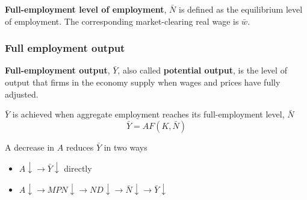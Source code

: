 \begin{definition}
    \textbf{Full-employment level of employment}, $ \bar{N} $ is defined as the equilibrium level of employment. The corresponding market-clearing real wage is $ \bar{w} $.
\end{definition}
\begin{center}
\end{center}
\subsubsection{Full employment output}
\begin{definition}
    \textbf{Full-employment output}, $\bar{Y}$, also called \textbf{potential output}, is the level of output that firms in the economy supply when wages and prices have fully adjusted. 

    $\bar{Y} $ is achieved when aggregate employment reaches its full-employment level, $\bar{N}$
    \[
        \bar{Y}  = AF \left( K, \bar{N}  \right) 
    \]
\end{definition}
\begin{remark}
    A decrease in $A$ reduces $\bar{Y} $ in two ways
    \begin{itemize}
        \item  $A \downarrow \rightarrow \bar{Y} \downarrow$ directly 
        \item  $A \downarrow \rightarrow MPN \downarrow \rightarrow ND \downarrow \rightarrow \bar{N} \downarrow \rightarrow \bar{Y} \downarrow $ 
    \end{itemize} 
\end{remark}

